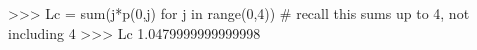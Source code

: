 
>>> Lc = sum(j*p(0,j) for j in range(0,4)) # recall this sums up to 4,
not including 4
>>> Lc
1.0479999999999998

